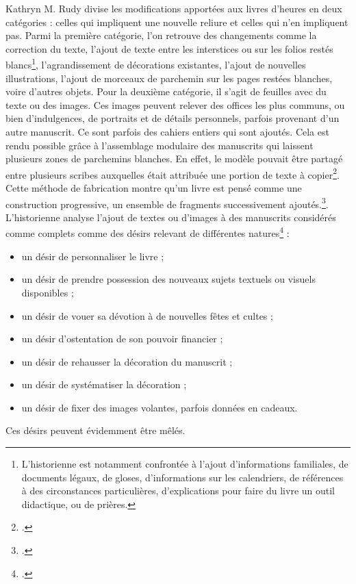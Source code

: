 \documentclass[a4paper,12pt,twoside]{book}
\begin{document}
Kathryn M. Rudy divise les modifications apportées aux livres d'heures en deux catégories : celles qui impliquent une nouvelle reliure et celles qui n'en impliquent pas. Parmi la première catégorie, l'on retrouve des changements comme la correction du texte, l'ajout de texte entre les interstices ou sur les folios restés blancs\footnote{L'historienne est notamment confrontée à l'ajout d'informations familiales, de documents légaux, de gloses, d'informations sur les calendriers, de références à des circonstances particulières, d'explications pour faire du livre un outil didactique, ou de prières.}, l'agrandissement de décorations existantes, l'ajout de nouvelles illustrations, l'ajout de morceaux de parchemin sur les pages restées blanches, voire d'autres objets. Pour la deuxième catégorie, il s'agit de feuilles avec du texte ou des images. Ces images peuvent relever des offices les plus communs, ou bien d'indulgences, de portraits et de détails personnels, parfois provenant d'un autre manuscrit. Ce sont parfois des cahiers entiers qui sont ajoutés. Cela est rendu possible grâce à l'assemblage modulaire des manuscrits qui laissent plusieurs zones de parchemins blanches. En effet, le modèle pouvait être partagé entre plusieurs scribes auxquelles était attribuée une portion de texte à copier\footcite[p. 89]{livre_medie}. Cette méthode de fabrication montre qu'un livre est pensé comme une construction progressive, un ensemble de fragments successivement ajoutés.\footcite[p. 9]{Piety_in_Pieces}. 
L'historienne analyse l'ajout de textes ou d'images à des manuscrits considérés comme complets comme des désirs relevant de différentes natures\footcite[p. 9]{Piety_in_Pieces} :
\begin{itemize}
    \item un désir de personnaliser le livre ;
    \item un désir de prendre possession des nouveaux sujets textuels ou visuels disponibles ;
    \item un désir de vouer sa dévotion à de nouvelles fêtes et cultes ;
    \item un désir d'ostentation de son pouvoir financier ;
    \item un désir de rehausser la décoration du manuscrit ;
    \item un désir de systématiser la décoration ;
    \item un désir de fixer des images volantes, parfois données en cadeaux. 
\end{itemize}
Ces désirs peuvent évidemment être mêlés. 
\end{document}
